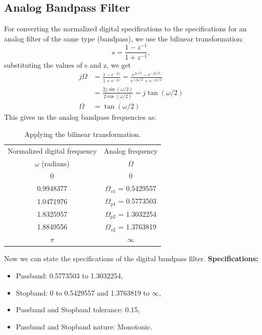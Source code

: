 \documentclass[12pt]{article}
\begin{document}
\subsection{Analog Bandpass Filter}
For converting the normalized digital specifications to the specifications for an analog filter of the same type (bandpass), we use the bilinear transformation:
\[s = \frac{1-z^{-1}}{1+z^{-1}},\]
substituting the values of s and z, we get
\begin{align*}
    j\Omega &= \frac{1-e^{-j\omega}}{1+e^{-j\omega}} = \frac{e^{j\omega/2}-e^{-j\omega/2}}{e^{+j\omega/2}+e^{-j\omega/2}}\\
    &= \frac{2j\sin(\omega/2)}{2\cos(\omega/2)} = j\tan(\omega/2)\\
    \Omega &= \tan(\omega/2)
\end{align*}
\newpage
This gives us the analog bandpass frequencies as:
\begin{table}[h]
    \centering
    \begin{tabular}{|c|c|}\hline
         Normalized digital frequency&Analog frequency\\
         $\omega$ (radians)&$\Omega$\\\hline
         0&0\\\hline
         0.9948377&$\Omega_{s1}$ = 0.5429557\\\hline
         1.0471976&$\Omega_{p1}$ = 0.5773503\\\hline
         1.8325957&$\Omega_{p2}$ = 1.3032254\\\hline
         1.8849556&$\Omega_{s2}$ = 1.3763819\\\hline
         $\pi$&$\infty$\\\hline
    \end{tabular}
    \caption{Applying the bilinear transformation.}
    \label{tab:2}
\end{table}

Now we can state the specifications of the digital bandpass filter.
\newline
\hline
\vspace{10pt}
\textbf{Specifications:}
\begin{itemize}
    \item Passband: 0.5773503 to 1.3032254,
    \item Stopband: 0 to 0.5429557 and 1.3763819 to  $\infty$,
    \item Passband and Stopband tolerance: 0.15,
    \item Passband and Stopband nature: Monotonic.
\end{itemize}
\hline
\end{document}
